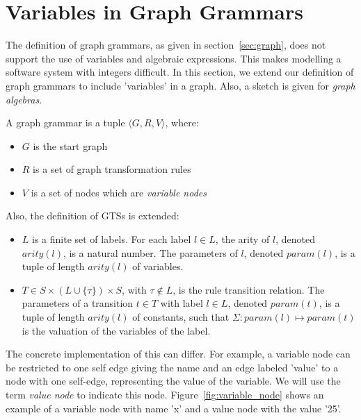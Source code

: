 \section{Variables in Graph Grammars}\label{sec:variables-in-graph-grammars}

The definition of graph grammars, as given in section~\ref{sec:graph}, does not support the use of variables and algebraic expressions. This makes modelling a software system with integers difficult. In this section, we extend our definition of graph grammars to include 'variables' in a graph. Also, a sketch is given for \textit{graph algebras}.
\\
\begin{definition}
A graph grammar is a tuple $\langle G, R, V\rangle$, where:
\begin{itemize}
  \item $G$ is the start graph
  \item $R$ is a set of graph transformation rules
  \item $V$ is a set of nodes which are \textit{variable nodes}
\end{itemize}
\end{definition}

Also, the definition of GTSs is extended:
\\
\begin{definition}
\begin{itemize}
\item $L$ is a finite set of labels. For each label $l\in L$, the arity of $l$, denoted $\mathit{arity(l)}$, is a natural number. The parameters of $l$, denoted $\mathit{param(l)}$, is a tuple of length $\mathit{arity(l)}$ of variables.
\item $T \in S \times (L \cup \{\tau\}) \times S$, with $\tau \notin L$, is the rule transition relation. The parameters of a transition $t \in T$ with label $l \in L$, denoted $\mathit{param(t)}$, is a tuple of length $\mathit{arity(l)}$ of constants, such that $\Sigma:\mathit{param(l)} \mapsto \mathit{param(t)}$ is the valuation of the variables of the label.
\end{itemize}
\end{definition}

The concrete implementation of this can differ. For example, a variable node can be restricted to one self edge giving the name and an edge labeled 'value' to a node with one self-edge, representing the value of the variable. We will use the term \textit{value node} to indicate this node. Figure~\ref{fig:variable_node} shows an example of a variable node with name 'x' and a value node with the value '25'.

